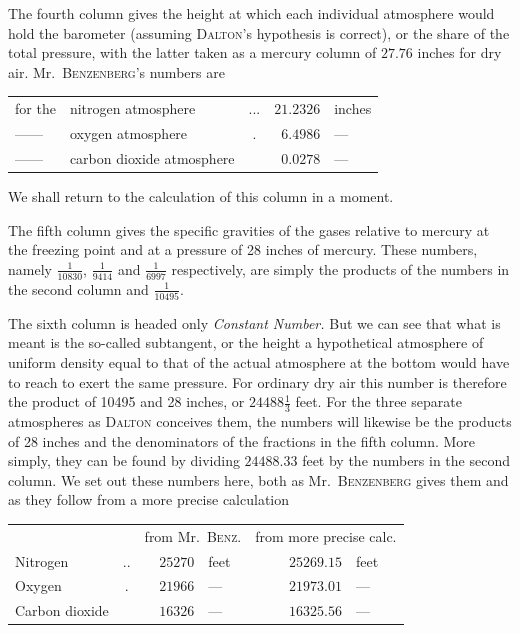 The fourth column gives the height at which each individual atmosphere would hold the barometer (assuming \textsc{Dalton}’s hypothesis is correct), or the share of the total pressure, with the latter taken as a mercury column of $27.76$ inches for dry air. Mr.\ \textsc{Benzenberg}’s numbers are
\begin{center}\begin{tabular}{llcrl}
for the & nitrogen atmosphere & .\quad .\quad . & $21.2326$ & inches\\
—\quad — & oxygen atmosphere & . & $6.4986$ & —\\
—\quad — & carbon dioxide atmosphere & & $0.0278$ & —
\end{tabular}\end{center}
We shall return to the calculation of this column in a moment.

The fifth column gives the specific gravities of the gases relative to mercury at the freezing point and at a pressure of 28 inches of mercury. These numbers, namely $\frac{1}{10830}$, $\frac{1}{9414}$ and $\frac{1}{6997}$ respectively, are simply the products of the numbers in the second column and $\frac{1}{10495}$.

The sixth column is headed only \textit{Constant Number.} But we can see that what is meant is the so-called subtangent, or the height a hypothetical atmosphere of uniform density equal to that of the actual atmosphere at the bottom would have to reach to exert the same pressure. For ordinary dry air this number is therefore the product of 10495 and 28 inches, or $24488\frac{1}{3}$ feet. For the three separate atmospheres as \textsc{Dalton} conceives them, the numbers will likewise be the products of 28 inches and the denominators of the fractions in the fifth column. More simply, they can be found by dividing $24488.33$ feet by the numbers in the second column. We set out these numbers here,
both as Mr.\ \textsc{Benzenberg} gives them and as they follow from a more precise calculation
\begin{center}\begin{tabular}{lcrlrl}
& & \multicolumn{2}{c}{from Mr.\ \textsc{Benz}.} & \multicolumn{2}{c}{from more precise calc.}\\
Nitrogen & .\quad . & $25270$ & feet & $25269.15$ & feet\\
Oxygen & . & $21966$ & — & $21973.01$ & —\\
Carbon dioxide & & $16326$ & — & $16325.56$ & —
\end{tabular}\end{center}

